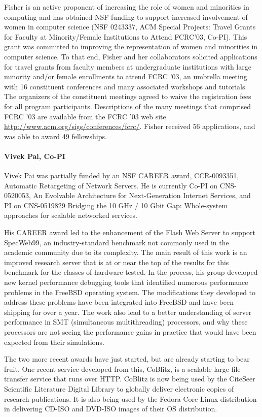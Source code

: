 \documentclass[10pt]{article}
\begin{document}
Fisher is an active proponent of increasing the role of women and
minorities in computing and has obtained NSF funding to support
increased involvement of women in computer science (NSF 0243337, ACM
Special Projects: Travel Grants for Faculty at Minority/Female
Institutions to Attend FCRC'03, Co-PI).  This grant was committed to
improving the representation of women and minorities in computer
science. To that end, Fisher and her collaborators 
solicited applications for travel grants from
faculty members at undergraduate institutions with large minority
and/or female enrollments to attend FCRC '03, an umbrella meeting with
16 constituent conferences and many associated workshops and
tutorials.  The organizers of the constituent meetings agreed to waive
the registration fees for all program participants.  Descriptions of
the many meetings that comprised FCRC '03 are available from the FCRC
'03 web site \url{http://www.acm.org/sigs/conferences/fcrc/}.  Fisher
received 56 applications, and was able to award 49 fellowships.

\paragraph*{Vivek Pai, Co-PI} Vivek Pai was partially funded by 
an NSF CAREER award, CCR-0093351, Automatic Retargeting of Network
Servers. He is currently Co-PI on CNS-0520053, An Evolvable
Architecture for Next-Generation Internet Services, and PI on
CNS-0519829 Bridging the 10 GHz / 10 Gbit Gap: Whole-system approaches
for scalable networked services.

His CAREER award led to the enhancement of the Flash Web Server to
support SpecWeb99, an industry-standard benchmark not commonly used in
the academic community due to its complexity. The main result of this
work is an improved research server that is at or near the top of the
results for this benchmark for the classes of hardware tested. In the
process, his group developed new kernel performance debugging tools
that identified numerous performance problems in the FreeBSD operating
system. The modifications they developed to address these problems
have been integrated into FreeBSD and have been shipping for over a
year.  The work also lead to a better understanding of server
performance in SMT (simultaneous multithreading) processors, and why
these processors are not seeing the performance gains in practice that
would have been expected from their simulations.

The two more recent awards have just started, but are already starting
to bear fruit. One recent service developed from this, CoBlitz, is a
scalable large-file transfer service that runs over HTTP. CoBlitz is
now being used by the CiteSeer Scientific Literature Digital Library
to globally deliver electronic copies of research publications. It is
also being used by the Fedora Core Linux distribution in delivering
CD-ISO and DVD-ISO images of their OS distribution.
\end{document}
